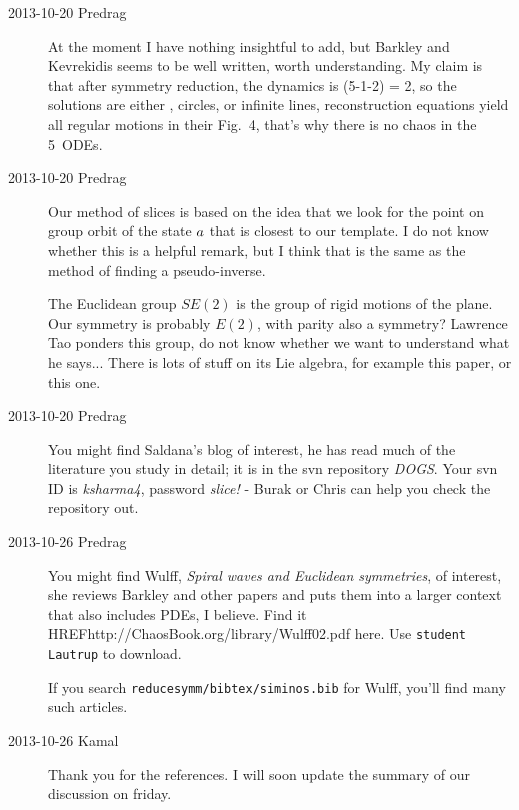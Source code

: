 \begin{description}
\item[2013-10-20 Predrag] At the moment I have nothing insightful to add,
but Barkley and Kevrekidis seems to be well written, worth
understanding. My claim is that after symmetry reduction, the dynamics is
(5-1-2) = 2\dmn, so the solutions are either \eqva, circles, or infinite
lines, reconstruction equations yield all regular motions in
their Fig.~4, that's why there is no chaos in the 5\dmn\ ODEs.

\item[2013-10-20 Predrag] Our method of slices is based on the idea that
we look for the point on group orbit of the state $a$ that is closest
to our template. I do not know whether this is a helpful remark, but
I think that is the same as the method of finding a
{pseudo-inverse}.

The Euclidean group $SE(2)$ is the group of rigid motions of the plane.
Our symmetry is probably $E(2)$, with parity also a symmetry? Lawrence Tao
ponders
{this group}, do not know whether we want to understand what he says...
There is lots of stuff on its Lie algebra, for example
{this paper}, or
{this one}.

\item[2013-10-20 Predrag] You might find Saldana's blog of interest, he
has read much of the literature you study in detail; it is
in the svn repository \emph{DOGS}. Your svn ID is \emph{ksharma4},
password \emph{slice!} - Burak or Chris can help you check the repository
out.

\item[2013-10-26 Predrag] You might find
Wulff, {\em Spiral waves and {Euclidean} symmetries}, of
interest, she reviews Barkley and other papers and puts them into a
larger context that also includes PDEs, I believe. Find it
HREF{http://ChaosBook.org/library/Wulff02.pdf} {here}. Use
\texttt{student} \texttt{Lautrup} to download.

If you search \texttt{reducesymm/bibtex/siminos.bib} for Wulff,
you'll find many such articles.

\item[2013-10-26 Kamal] Thank you for the references. I will soon
update the summary of our discussion on friday.


\end{description}
